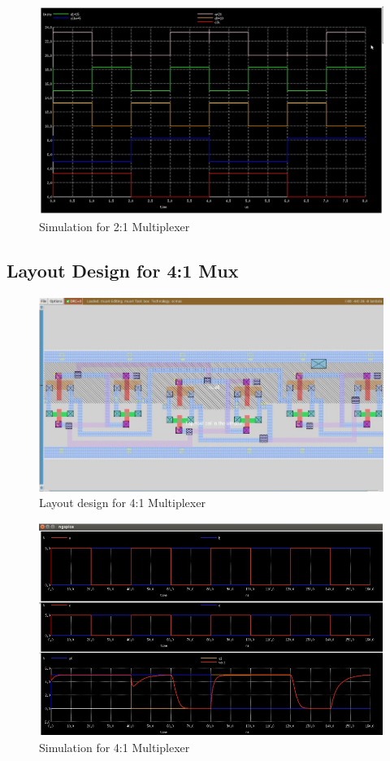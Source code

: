 \documentclass[12pt,a4paper]{article}
\begin{document}
\begin{center}
\begin{figure}[h]
\centering
\includegraphics[scale=.42]{2_1mux1.jpg}
\caption[Short]{Simulation for 2:1 Multiplexer}
\end{figure}
\clearpage
\subsection{Layout Design for 4:1 Mux}
\begin{figure}[h]
\centering
\includegraphics[scale=.5]{4_1mux.jpg}
\caption[Short]{Layout design for 4:1 Multiplexer}
\end{figure}

\begin{figure}[h]
\centering
\includegraphics[scale=.5]{4mux.jpg}
\caption[Short]{Simulation for 4:1 Multiplexer}
\end{figure}
 
\end{center}



\end{document}
